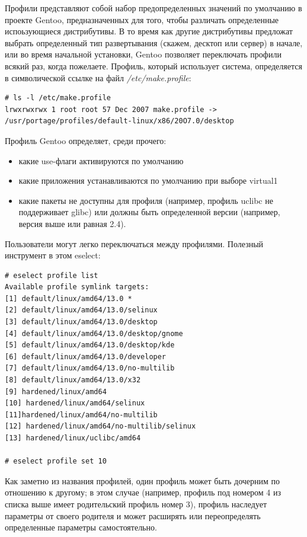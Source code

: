 \documentclass[10pt]{book}
\begin{document}
Профили представляют собой набор предопределенных значений по умолчанию в проекте Gentoo, предназначенных для того, чтобы различать определенные испоьзующиеся дистрибутивы. В то время как другие дистрибутивы предложат выбрать определенный тип развертывания (скажем, десктоп или сервер) в начале, или во время начальной установки, Gentoo позволяет переключать профили всякий раз, когда пожелаете.
Профиль, который использует система, определяется в символической ссылке на файл \textit{/etc/make.profile}:
 \begin{tcolorbox}
\begin{lstlisting}
# ls -l /etc/make.profile
lrwxrwxrwx 1 root root 57 Dec 2007 make.profile ->
/usr/portage/profiles/default-linux/x86/20O7.0/desktop
\end{lstlisting}
\end{tcolorbox}
Профиль Gentoo определяет, среди прочего:

\begin{itemize} 
\item какие use-флаги активируются по умолчанию
\item какие приложения устанавливаются по умолчанию при выборе virtual1
\item какие пакеты не доступны для профиля (например, профиль uclibc не поддерживает glibc) или должны быть определенной версии (например, версия выше или равная 2.4).
\end{itemize}
Пользователи могут легко переключаться между профилями. Полезный инструмент в этом eselect:
 \begin{tcolorbox}
\begin{lstlisting}
# eselect profile list
Available profile symlink targets:
[1] default/linux/amd64/13.0 *
[2] default/linux/amd64/13.0/selinux
[3] default/linux/amd64/13.0/desktop
[4] default/linux/amd64/13.0/desktop/gnome
[5] default/linux/amd64/13.0/desktop/kde
[6] default/linux/amd64/13.0/developer
[7] default/linux/amd64/13.0/no-multilib
[8] default/linux/amd64/13.0/x32
[9] hardened/linux/amd64
[10] hardened/linux/amd64/selinux
[11]hardened/linux/amd64/no-multilib
[12] hardened/linux/amd64/no-multilib/selinux
[13] hardened/linux/uclibc/amd64

# eselect profile set 10
\end{lstlisting}
\end{tcolorbox}
Как заметно из названия профилей, один профиль может быть дочерним по отношению к другому; в этом случае (например, профиль под номером 4 из списка выше имеет родительский профиль номер 3), профиль наследует параметры от своего родителя и может расширять или переопределять определенные параметры самостоятельно.
\end{document}
